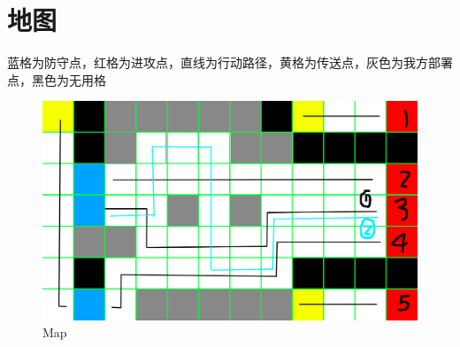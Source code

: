\documentclass[a4paper,12pt]{article}
\begin{document}
	\section{地图}
		蓝格为防守点，红格为进攻点，直线为行动路径，黄格为传送点，灰色为我方部署点，黑色为无用格
		\begin{figure}[p]
			\centering
			\includegraphics[width=1\textwidth]{map2}
			\caption{Map}
		\end{figure}
\end{document}
